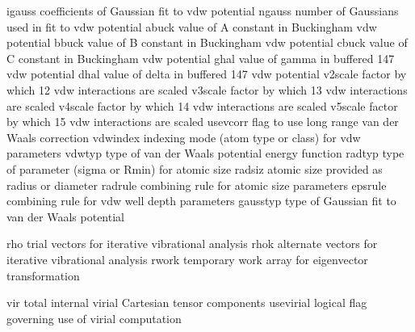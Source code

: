 \documentclass[letterpaper,11pt,english]{sphinxmanual}
\begin{document}

\begin{sphinxVerbatim}[commandchars=\\\{\}]
igauss          coefficients of Gaussian fit to vdw potential
ngauss          number of Gaussians used in fit to vdw potential
abuck           value of \PYGZdq{}A\PYGZdq{} constant in Buckingham vdw potential
bbuck           value of \PYGZdq{}B\PYGZdq{} constant in Buckingham vdw potential
cbuck           value of \PYGZdq{}C\PYGZdq{} constant in Buckingham vdw potential
ghal            value of \PYGZdq{}gamma\PYGZdq{} in buffered 14\PYGZhy{}7 vdw potential
dhal            value of \PYGZdq{}delta\PYGZdq{} in buffered 14\PYGZhy{}7 vdw potential
v2scale         factor by which 1\PYGZhy{}2 vdw interactions are scaled
v3scale         factor by which 1\PYGZhy{}3 vdw interactions are scaled
v4scale         factor by which 1\PYGZhy{}4 vdw interactions are scaled
v5scale         factor by which 1\PYGZhy{}5 vdw interactions are scaled
use\PYGZus{}vcorr       flag to use long range van der Waals correction
vdwindex        indexing mode (atom type or class) for vdw parameters
vdwtyp          type of van der Waals potential energy function
radtyp          type of parameter (sigma or R\PYGZhy{}min) for atomic size
radsiz          atomic size provided as radius or diameter
radrule         combining rule for atomic size parameters
epsrule         combining rule for vdw well depth parameters
gausstyp        type of Gaussian fit to van der Waals potential
\end{sphinxVerbatim}


\begin{sphinxVerbatim}[commandchars=\\\{\}]
rho             trial vectors for iterative vibrational analysis
rhok            alternate vectors for iterative vibrational analysis
rwork           temporary work array for eigenvector transformation
\end{sphinxVerbatim}


\begin{sphinxVerbatim}[commandchars=\\\{\}]
vir             total internal virial Cartesian tensor components
use\PYGZus{}virial      logical flag governing use of virial computation
\end{sphinxVerbatim}
\end{document}
